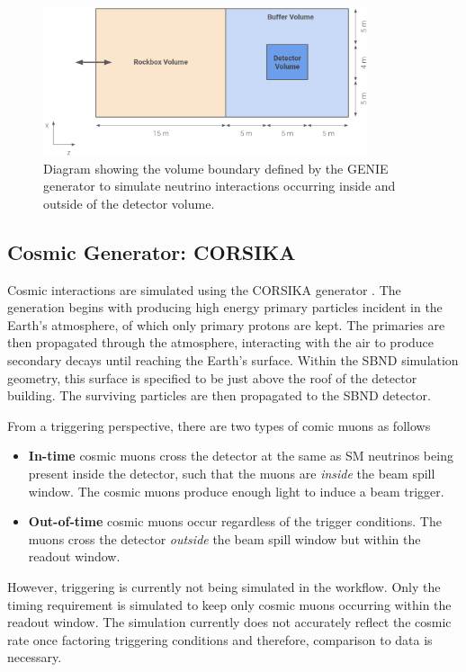 \begin{figure}[htbp!] 
\centering    
\includegraphics[width=0.85\textwidth]{Rockbox_Volume}
\caption[Rockbox_Volume]{
Diagram showing the volume boundary defined by the GENIE generator to simulate neutrino interactions occurring inside and outside of the detector volume. 
}
\label{fig:Rockbox_Volume}
\end{figure}

\subsection{Cosmic Generator: CORSIKA}
\label{sec:gen_corsika}

Cosmic interactions are simulated using the CORSIKA generator \cite{corsika}.
The generation begins with producing high energy primary particles incident in the Earth's atmosphere, of which only primary protons are kept. 
The primaries are then propagated through the atmosphere, interacting with the air to produce secondary decays until reaching the Earth's surface.
Within the SBND simulation geometry, this surface is specified to be just above the roof of the detector building.
The surviving particles are then propagated to the SBND detector.

From a triggering perspective, there are two types of comic muons as follows 
\begin{itemize}
        \item\textbf{In-time} cosmic muons cross the detector at the same as SM neutrinos being present inside the detector, such that the muons are \textit{inside} the beam spill window. The cosmic muons produce enough light to
 induce a beam trigger.                            
        \item\textbf{Out-of-time} cosmic muons occur regardless of the trigger conditions. The muons cross the detector \textit{outside} the beam spill window but within the readout window.  
\end{itemize}
However, triggering is currently not being simulated in the workflow. 
Only the timing requirement is simulated to keep only cosmic muons occurring within the readout window.
The simulation currently does not accurately reflect the cosmic rate once factoring triggering conditions and therefore, comparison to data is necessary. 

